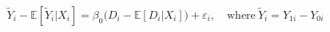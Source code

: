 \documentclass[a4paper,12pt]{article}
\begin{document}
\begin{align*}
\tilde{Y}_i - \mathbb{E}[ \tilde{Y}_i | X_i] = \beta_0 \big(D_i - \mathbb{E}[D_i |X_i]\big) + \varepsilon_i, \quad \textrm{where} \ \tilde{Y}_i =  Y_{1i} - Y_{0i} 
\end{align*}

\end{document}
